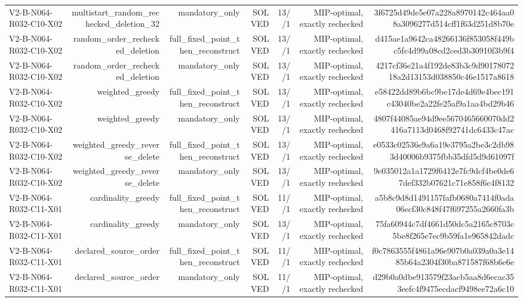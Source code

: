 {\begin{longtable}{lrrrrrr}
V2-B-N064-R032-C10-X02 & multistart\_random\_rechecked\_deletion\_32 & mandatory\_only & SOLVED & 13//1 & MIP-optimal, exactly rechecked & 3f6725d49de5e07a228a8970142c464aa08a3096277d514cff1f63d251d8b70e \\
V2-B-N064-R032-C10-X02 & random\_order\_rechecked\_deletion & full\_fixed\_point\_then\_reconstruct & SOLVED & 13//1 & MIP-optimal, exactly rechecked & d415ae1a9642ca48266136f853058f449bc5fc4d99a08cd2ced3b30910f3b9f4 \\
V2-B-N064-R032-C10-X02 & random\_order\_rechecked\_deletion & mandatory\_only & SOLVED & 13//1 & MIP-optimal, exactly rechecked & 4217cf36e21a4f192de83b3c9d9017807218a2d13153d038850c46e1517a8618 \\
V2-B-N064-R032-C10-X02 & weighted\_greedy & full\_fixed\_point\_then\_reconstruct & SOLVED & 13//1 & MIP-optimal, exactly rechecked & e58422dd89b6bc9be17de4d69e4bec191c43040be2a22fe25af9a1aa4bd29b46 \\
V2-B-N064-R032-C10-X02 & weighted\_greedy & mandatory\_only & SOLVED & 13//1 & MIP-optimal, exactly rechecked & 4807f44085ae94d9ee5670465660070dd2416a7113d0468f92741dc6433c47ac \\
V2-B-N064-R032-C10-X02 & weighted\_greedy\_reverse\_delete & full\_fixed\_point\_then\_reconstruct & SOLVED & 13//1 & MIP-optimal, exactly rechecked & e0533c02536e9a6a19e3795a2be3c2db983d40006b9375fbb35dfd5d9d61097f \\
V2-B-N064-R032-C10-X02 & weighted\_greedy\_reverse\_delete & mandatory\_only & SOLVED & 13//1 & MIP-optimal, exactly rechecked & 9e035012a1a1729f6412e7fc9dcf4be0de67def332b07621c71e858f6c4f8132 \\
V2-B-N064-R032-C11-X01 & cardinality\_greedy & full\_fixed\_point\_then\_reconstruct & SOLVED & 11//1 & MIP-optimal, exactly rechecked & a5b8c9d8d1491157fafb0680a7414f0ada06ecf30c848f47f697255a2660fa3b \\
V2-B-N064-R032-C11-X01 & cardinality\_greedy & mandatory\_only & SOLVED & 13//1 & MIP-optimal, exactly rechecked & 75fa60944c7df4661d50dc5a2165c8703c5be8f265e7ec9b59fa1e965842dadc \\
V2-B-N064-R032-C11-X01 & declared\_source\_order & full\_fixed\_point\_then\_reconstruct & SOLVED & 11//1 & MIP-optimal, exactly rechecked & f0c7863555f4861a96e907b0a039a0a3e1485b64a2304f30ba871587f68b6e6e \\
V2-B-N064-R032-C11-X01 & declared\_source\_order & mandatory\_only & SOLVED & 11//1 & MIP-optimal, exactly rechecked & d29b0a0dbe913579f23acb5aa8d6ecac353eefc4f9475ecdacf9498ee72a6c10 \\

\end{longtable}}
